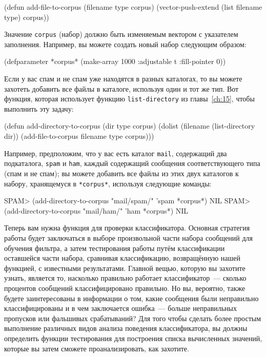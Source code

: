 \begin{myverb}
(defun add-file-to-corpus (filename type corpus)
  (vector-push-extend (list filename type) corpus))
\end{myverb}

Значение \lstinline{corpus} (набор) должно быть изменяемым вектором с указателем заполнения.
Например, вы можете создать новый набор следующим образом:

\begin{myverb}
(defparameter *corpus* (make-array 1000 :adjustable t :fill-pointer 0))
\end{myverb}

Если у вас спам и не спам уже находятся в разных каталогах, то вы можете захотеть добавить
все файлы в каталоге, используя один и тот же тип.  Вот функция, которая использует функцию
\lstinline{list-directory} из главы~\ref{ch:15}, чтобы выполнить эту задачу:

\begin{myverb}
(defun add-directory-to-corpus (dir type corpus)
  (dolist (filename (list-directory dir))
    (add-file-to-corpus filename type corpus)))
\end{myverb}

Например, предположим, что у вас есть каталог \lstinline{mail}, содержащий два подкаталога,
\lstinline{spam} и \lstinline{ham}, каждый содержащий сообщения соответствующего типа (спам и
не спам); вы можете добавить все файлы из этих двух каталогов к набору, хранящемуся в
\lstinline{*corpus*}, используя следующие команды:

\begin{myverb}
SPAM> (add-directory-to-corpus "mail/spam/" 'spam *corpus*)
NIL
SPAM> (add-directory-to-corpus "mail/ham/" 'ham *corpus*)
NIL
\end{myverb}

Теперь вам нужна функция для проверки классификатора.  Основная стратегия работы будет
заключаться в выборе произвольной части набора сообщений для обучения фильтра, а затем
тестирования работы путём классификации оставшейся части набора, сравнивая классификацию,
возвращённую нашей функцией, с известными результатами.  Главной вещью, которую вы захотите
узнать, является то, насколько правильно работает классификатор~--- сколько процентов
сообщений классифицировано правильно.  Но вы, вероятно, также будете заинтересованы в
информации о том, какие сообщения были неправильно классифицированы и в чем заключается
ошибка~--- больше неправильных пропусков или фальшивых срабатываний?  Для того чтобы
сделать более простым выполнение различных видов анализа поведения классификатора, вы
должны определить функции тестирования для построения списка вычисленных значений,
которые вы затем сможете проанализировать, как захотите.

